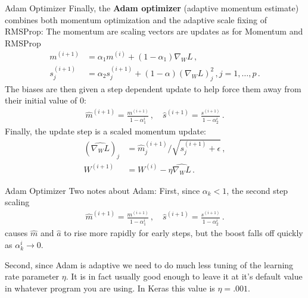 \documentclass[10pt, table, dvipsnames,xcdraw,handout]{beamer}
\begin{document}
\begin{frame}[fragile]{Adam Optimizer}
Finally, the \textbf{Adam optimizer} (adaptive momentum estimate) combines both momentum optimization and the adaptive scale fixing of RMSProp: The momentum are scaling vectors are updates as for Momentum and RMSProp
\begin{align*}
m^{(i+1)} &= \alpha_1 m^{(i)} + (1-\alpha_1) \nabla_{W} L\,,
\\
s_j^{(i+1)} &= \alpha_2 s_j^{(i+1)} + (1-\alpha) (\nabla_{W} L) _j^2\,,j=1,\ldots, p\,.
\end{align*}\pause
The biases are then given a step dependent update to help force them away from their initial value of 0:
\begin{align*}
\hat{m}^{(i+1)} = \frac{{m}^{(i+1)}}{1-\alpha^i_1}\,,\hspace{1em}
\hat{s}^{(i+1)} = \frac{{s}^{(i+1)}}{1-\alpha^i_2}\,.
\end{align*}\pause
Finally, the update step is a scaled momentum update:
\begin{align*}
(\hat{\nabla_{W} L})_j &= \hat{m}^{(i+1)}_j/\sqrt{s_j^{(i+1)}+\epsilon} \,,
\\
W^{(i+1)} &= W^{(i)} - \eta \hat{\nabla_{W} L}\,.
\end{align*}

\end{frame}



\begin{frame}[fragile]{Adam Optimizer}
Two notes about Adam: First, since $\alpha_k<1$, the second step scaling 
\begin{align*}
\hat{m}^{(i+1)} = \frac{{m}^{(i+1)}}{1-\alpha^i_1}\,,\hspace{1em}
\hat{s}^{(i+1)} = \frac{{s}^{(i+1)}}{1-\alpha^i_2}\,.
\end{align*}
causes $\hat{m}$ and $\hat{a}$ to rise more rapidly for early steps, but the boost falls off quickly as $\alpha_k^i\to 0$.\pause

Second, since Adam is adaptive we need to do much less tuning of the learning rate parameter $\eta$. It is in fact usually good enough to leave it at it's default value in whatever program you are using. In Keras this value is $\eta = .001$. 

\end{frame}
\end{document}

